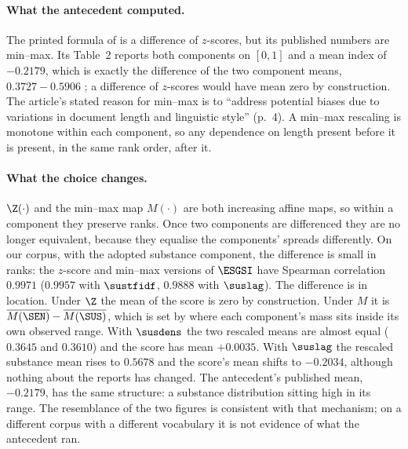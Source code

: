 \paragraph{What the antecedent computed.}
\label{sec:artefact-which}
The printed formula of \citet[p.~4]{lagasio2024} is a difference of
$z$-scores, but its published numbers are min--max. Its Table~2 reports both
components on $[0,1]$ and a mean index of $-0.2179$, which is exactly the
difference of the two component means, $0.3727 - 0.5906$
\citep[p.~6]{lagasio2024}; a difference of $z$-scores would have mean zero by
construction. The article's stated reason for min--max is to ``address
potential biases due to variations in document length and linguistic style''
(p.~4). A min--max rescaling is monotone within each component, so any
dependence on length present before it is present, in the same rank order,
after it.

\paragraph{What the choice changes.} $\Z(\cdot)$ and the min--max map
$M(\cdot)$ are both increasing affine maps, so within a component they
preserve ranks. Once two components are differenced they are no longer
equivalent, because they equalise the components' spreads differently. On our
corpus, with the adopted substance component, the difference is small in
ranks: the $z$-score and min--max versions of $\ESGSI$ have Spearman
correlation $0.9971$ ($0.9957$ with $\sustfidf$, $0.9888$ with $\suslag$). The
difference is in location. Under $\Z$ the mean of the score is zero by
construction. Under $M$ it is $\overline{M(\SEN)} - \overline{M(\SUS)}$, which
is set by where each component's mass sits inside its own observed range. With
$\susdens$ the two rescaled means are almost equal ($0.3645$ and $0.3610$) and
the score has mean $+0.0035$. With $\suslag$ the rescaled substance mean rises
to $0.5678$ and the score's mean shifts to $-0.2034$, although nothing about
the reports has changed. The antecedent's published mean, $-0.2179$, has the
same structure: a substance distribution sitting high in its range. The
resemblance of the two figures is consistent with that mechanism; on a
different corpus with a different vocabulary it is not evidence of what the
antecedent ran.

